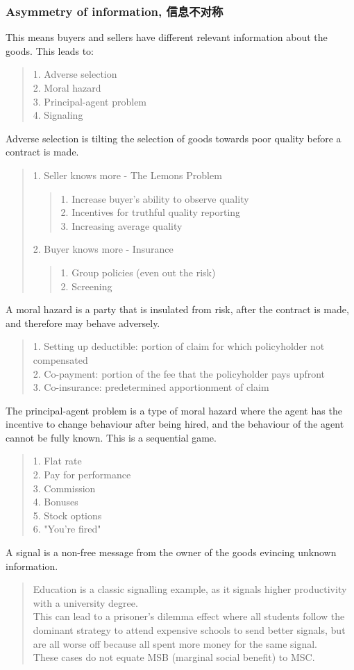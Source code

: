 \subsubsection{Asymmetry of information, 信息不对称}
This means buyers and sellers have different relevant information about the goods. This leads to:
\begin{quote}
    1. Adverse selection \\
    2. Moral hazard \\
    3. Principal-agent problem \\
    4. Signaling
\end{quote}
Adverse selection is tilting the selection of goods towards poor quality before a contract is made.
\begin{quote}
    1. Seller knows more - The Lemons Problem
    \begin{quote}
        1. Increase buyer's ability to observe quality \\
        2. Incentives for truthful quality reporting \\
        3. Increasing average quality
    \end{quote}
    2. Buyer knows more - Insurance
    \begin{quote}
        1. Group policies (even out the risk) \\
        2. Screening
    \end{quote}
\end{quote}
A moral hazard is a party that is insulated from risk, after the contract is made, and therefore may behave adversely.
\begin{quote}
    1. Setting up deductible: portion of claim for which policyholder not compensated \\
    2. Co-payment: portion of the fee that the policyholder pays upfront \\
    3. Co-insurance: predetermined apportionment of claim
\end{quote}
The principal-agent problem is a type of moral hazard where the agent has the incentive to change behaviour after being hired, and the behaviour of the agent cannot be fully known. This is a sequential game.
\begin{quote}
    1. Flat rate \\
    2. Pay for performance \\
    3. Commission \\
    4. Bonuses \\
    5. Stock options \\
    6. "You're fired"
\end{quote}
A signal is a non-free message from the owner of the goods evincing unknown information.
\begin{quote}
    Education is a classic signalling example, as it signals higher productivity with a university degree. \\
    This can lead to a prisoner's dilemma effect where all students follow the dominant strategy to attend expensive schools to send better signals, but are all worse off because all spent more money for the same signal. \\
    These cases do not equate MSB (marginal social benefit) to MSC.
\end{quote}\

